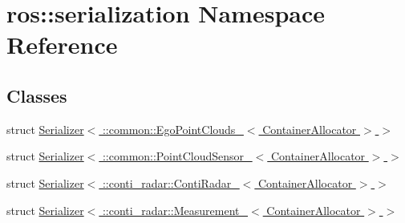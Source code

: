 \hypertarget{namespaceros_1_1serialization}{}\section{ros\+:\+:serialization Namespace Reference}
\label{namespaceros_1_1serialization}
\subsection*{Classes}
\begin{DoxyCompactItemize}
\item 
struct \hyperlink{structros_1_1serialization_1_1Serializer_3_01_1_1common_1_1EgoPointClouds___3_01ContainerAllocator_01_4_01_4}{Serializer$<$ \+::common\+::\+Ego\+Point\+Clouds\+\_\+$<$ Container\+Allocator $>$ $>$}
\item 
struct \hyperlink{structros_1_1serialization_1_1Serializer_3_01_1_1common_1_1PointCloudSensor___3_01ContainerAllocator_01_4_01_4}{Serializer$<$ \+::common\+::\+Point\+Cloud\+Sensor\+\_\+$<$ Container\+Allocator $>$ $>$}
\item 
struct \hyperlink{structros_1_1serialization_1_1Serializer_3_01_1_1conti__radar_1_1ContiRadar___3_01ContainerAllocator_01_4_01_4}{Serializer$<$ \+::conti\+\_\+radar\+::\+Conti\+Radar\+\_\+$<$ Container\+Allocator $>$ $>$}
\item 
struct \hyperlink{structros_1_1serialization_1_1Serializer_3_01_1_1conti__radar_1_1Measurement___3_01ContainerAllocator_01_4_01_4}{Serializer$<$ \+::conti\+\_\+radar\+::\+Measurement\+\_\+$<$ Container\+Allocator $>$ $>$}
\end{DoxyCompactItemize}
